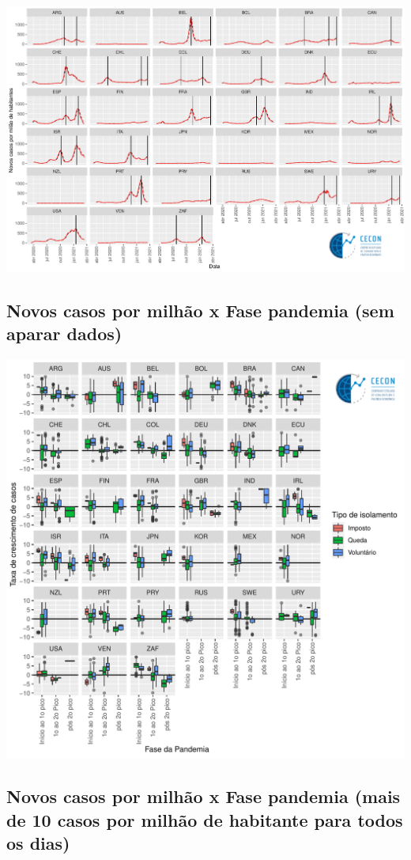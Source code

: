 \documentclass{SelfArx}
\begin{document}
\begin{center}
\includegraphics[width=.9\linewidth]{./figs/COVID/Picos.pdf}
\end{center}

\subsection*{Novos casos por milhão x Fase pandemia (sem aparar dados)}
\label{sec:org3533c16}

\begin{center}
\includegraphics[width=.9\linewidth]{./figs/COVID/Casos_Policy_Todos.pdf}
\end{center}

\subsection*{Novos casos por milhão x Fase pandemia (mais de 10 casos por milhão de habitante para todos os dias)}
\label{sec:org53690d0}
\end{document}
